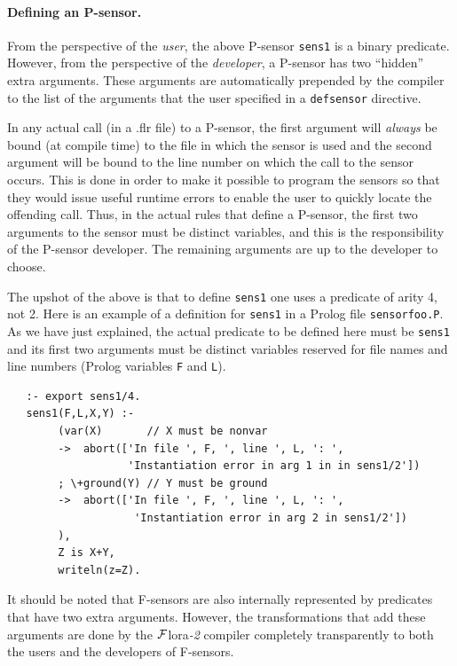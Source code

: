 \documentclass[11pt]{article}
\newcommand{\FLORA}{{\mbox{\sc ${\cal F}${lora}\rm\emph{-2}}}\xspace}
\begin{document}
\paragraph{Defining an P-sensor.}
From the perspective of the \emph{user}, the above P-sensor
\texttt{sens1} is
a binary predicate. However, 
from the perspective of the \emph{developer}, a P-sensor has two
``hidden'' extra arguments. These arguments 
are automatically prepended by the compiler to the list of the arguments
that the user specified in a \texttt{defsensor} directive. 

In any actual call (in a .flr file) to a P-sensor, the first argument will
\emph{always} be bound (at compile time) to the
file in which the sensor is used and the second 
argument will be bound to the line number
on which the call to the sensor occurs.
This is done in order to make it possible to program the sensors so that they
would issue useful runtime errors to
enable the user to quickly locate the offending call. 
Thus, in the actual rules that define a P-sensor,
the first two arguments to the sensor must be distinct variables, and this
is the responsibility of the P-sensor developer.
The remaining arguments are up to the developer to choose.

The upshot of the above is that
to define \texttt{sens1} one uses
a predicate of arity 4, not 2.  
Here is an example of a definition for \texttt{sens1} in a Prolog file
\texttt{sensorfoo.P}. As we have just
explained, the actual predicate to be defined here must be \texttt{sens1}
and its first two arguments must be distinct variables 
reserved for file names and line numbers
(Prolog variables \texttt{F} and \texttt{L}).  
\begin{verbatim}
   :- export sens1/4.
   sens1(F,L,X,Y) :-
        (var(X)       // X must be nonvar
        ->  abort(['In file ', F, ', line ', L, ': ',
                   'Instantiation error in arg 1 in in sens1/2'])
        ; \+ground(Y) // Y must be ground
        ->  abort(['In file ', F, ', line ', L, ': ',
                    'Instantiation error in arg 2 in sens1/2'])
        ),
        Z is X+Y,
        writeln(z=Z).
\end{verbatim}

It should be noted that F-sensors are also internally represented by
predicates that have two extra arguments. However, the transformations that
add these arguments are done by the \FLORA compiler completely
transparently to both the users and the developers of F-sensors.
\end{document}

